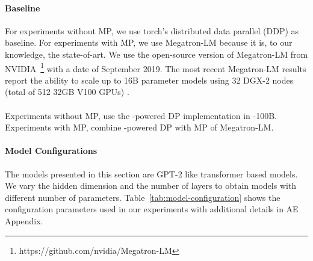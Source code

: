 \paragraph{Baseline}
For experiments without MP, we use torch's distributed data parallel (DDP) as baseline. For experiments with MP, we use Megatron-LM because it is, to our knowledge, the state-of-art. We use the open-source version of Megatron-LM from NVIDIA~\footnote{https://github.com/nvidia/Megatron-LM} with a date of September 2019. The most recent Megatron-LM results report the ability to scale up to 16B parameter models using 32 DGX-2 nodes (total of 512 32GB V100 GPUs) \cite{megatronlm}. %

\paragraph{\name}
Experiments without MP, use the \name-powered DP implementation in \name-100B. 
Experiments with MP, combine \name-powered DP with MP of Megatron-LM.

\paragraph{Model Configurations}
The models presented in this section are GPT-2 \cite{gpt-2} like transformer based models. We vary the hidden dimension and the number of layers to obtain models with different number of parameters. Table~\ref{tab:model-configuration} shows the configuration parameters used in our experiments with additional details in AE Appendix.

